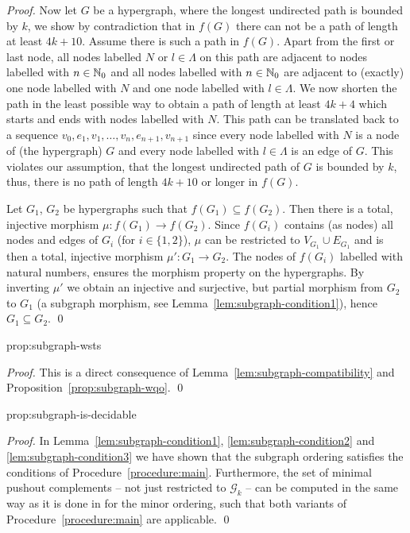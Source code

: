 \documentclass{llncs}
\newcommand{\subOrder}{\subseteq}
\begin{document}
{\begin{proof}
  Now let $G$ be a hypergraph, where the longest undirected path is bounded by
  $k$, we show by contradiction that in $f(G)$ there can not be a path
  of length at least $4k+10$. Assume there is such a path in $f(G)$.
  Apart from the first or last node, all nodes labelled $N$ or $l \in
  \Lambda$ on this path are adjacent to nodes labelled with $n \in
  \mathbb{N}_0$ and all nodes labelled with $n \in \mathbb{N}_0$ are adjacent to
  (exactly) one node labelled with $N$ and one node labelled with $l
  \in \Lambda$. We now shorten the path in the least possible way to
  obtain a path of length at least $4k+4$ which starts and ends with
  nodes labelled with $N$. This path can be translated back to a
  sequence $v_0, e_1, v_1, \ldots, v_n, e_{n+1}, v_{n+1}$ since every
  node labelled with $N$ is a node of (the hypergraph) $G$ and every
  node labelled with $l \in \Lambda$ is an edge of $G$. This violates
  our assumption, that the longest undirected path of $G$ is bounded by $k$,
  thus, there is no path of length $4k+10$ or longer in $f(G)$.

  Let $G_1$, $G_2$ be hypergraphs such that $f(G_1) \subOrder f(G_2)$.
  Then there is a total, injective morphism $\mu : f(G_1) \to f(G_2)$.
  Since $f(G_i)$ contains (as nodes) all nodes and edges of $G_i$ (for
  $i \in \{1,2\}$), $\mu$ can be restricted to $V_{G_1} \cup E_{G_1}$
  and is then a total, injective morphism $\mu' : G_1 \to G_2$. The
  nodes of $f(G_i)$ labelled with natural numbers, ensures the
  morphism property on the hypergraphs. By inverting $\mu'$ we obtain
  an injective and surjective, but partial morphism from $G_2$ to
  $G_1$ (a subgraph morphism, see Lemma~\ref{lem:subgraph-condition1}), hence 
  $G_1 \subOrder G_2$. \qed 
\end{proof}

\begin{proposition_app}[\propSubgraphWSTSTitle]{prop:subgraph-wsts}
\propSubgraphWSTS
\end{proposition_app}

\begin{proof}
This is a direct consequence of Lemma~\ref{lem:subgraph-compatibility} and 
Proposition~\ref{prop:subgraph-wqo}. \qed
\end{proof}

\begin{proposition_app}{prop:subgraph-is-decidable}
\propSubgraphDecidable
\end{proposition_app}

\begin{proof}
  In Lemma~\ref{lem:subgraph-condition1},
  \ref{lem:subgraph-condition2} and \ref{lem:subgraph-condition3} we
  have shown that the subgraph ordering satisfies the conditions of
  Procedure~\ref{procedure:main}. Furthermore, the set of minimal
  pushout complements -- not just restricted to $\mathcal{G}_k$ -- can
  be computed in the same way as it is done in \cite{JK08} for the
  minor ordering, such that both variants of
  Procedure~\ref{procedure:main} are applicable. \qed
\end{proof}

}
\end{document}
